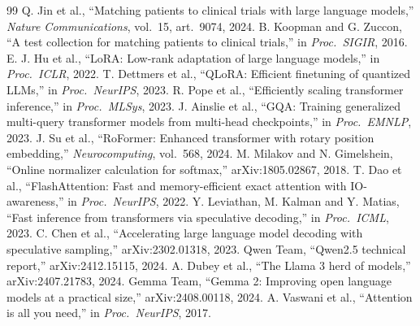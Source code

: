 \documentclass[conference]{IEEEtran}
\begin{document}
\begin{thebibliography}{99}
 Q. Jin et al., ``Matching patients to clinical trials with large language models,'' \emph{Nature Communications}, vol.~15, art.~9074, 2024.
 B. Koopman and G. Zuccon, ``A test collection for matching patients to clinical trials,'' in \emph{Proc.\ SIGIR}, 2016.
 E. J. Hu et al., ``LoRA: Low-rank adaptation of large language models,'' in \emph{Proc.\ ICLR}, 2022.
 T. Dettmers et al., ``QLoRA: Efficient finetuning of quantized LLMs,'' in \emph{Proc.\ NeurIPS}, 2023.
 R. Pope et al., ``Efficiently scaling transformer inference,'' in \emph{Proc.\ MLSys}, 2023.
 J. Ainslie et al., ``GQA: Training generalized multi-query transformer models from multi-head checkpoints,'' in \emph{Proc.\ EMNLP}, 2023.
 J. Su et al., ``RoFormer: Enhanced transformer with rotary position embedding,'' \emph{Neurocomputing}, vol.~568, 2024.
 M. Milakov and N. Gimelshein, ``Online normalizer calculation for softmax,'' arXiv:1805.02867, 2018.
 T. Dao et al., ``FlashAttention: Fast and memory-efficient exact attention with IO-awareness,'' in \emph{Proc.\ NeurIPS}, 2022.
 Y. Leviathan, M. Kalman and Y. Matias, ``Fast inference from transformers via speculative decoding,'' in \emph{Proc.\ ICML}, 2023.
 C. Chen et al., ``Accelerating large language model decoding with speculative sampling,'' arXiv:2302.01318, 2023.
 Qwen Team, ``Qwen2.5 technical report,'' arXiv:2412.15115, 2024.
 A. Dubey et al., ``The Llama 3 herd of models,'' arXiv:2407.21783, 2024.
 Gemma Team, ``Gemma 2: Improving open language models at a practical size,'' arXiv:2408.00118, 2024.
 A. Vaswani et al., ``Attention is all you need,'' in \emph{Proc.\ NeurIPS}, 2017.
\end{thebibliography}
\end{document}

